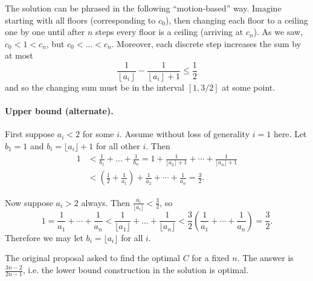 \begin{remark*}
  The solution can be phrased in the following ``motion-based'' way.
  Imagine starting with all floors (corresponding to $c_0$),
  then changing each floor to a ceiling one by one
  until after $n$ steps every floor is a ceiling (arriving at $c_n$).
  As we saw, $c_0 < 1 < c_n$, but $c_0 < \dots < c_n$.
  Moreover, each discrete step increases the sum by at most
  \[ \frac{1}{\left\lfloor a_i \right\rfloor}
    - \frac{1}{\left\lfloor a_i \right\rfloor + 1} \leq \frac 12 \]
  and so the changing sum must be in the interval $[1, 3/2]$ at some point.
\end{remark*}

\paragraph{Upper bound (alternate).}
First suppose $a_i < 2$ for some $i$. Assume without loss of generality $i=1$
here. Let $b_1=1$ and $b_i=\lfloor a_i\rfloor+1$ for all other $i$. Then
\begin{align*}
  1 &< \frac{1}{b_1} + \dots + \frac{1}{b_n} = 1 + \frac{1}{\lfloor a_2\rfloor +
  1} + \dotsb + \frac{1}{\lfloor a_n\rfloor + 1} \\
  &< \left(\frac{1}{2} +
  \frac{1}{a_1}\right) + \frac{1}{a_2} + \dotsb + \frac{1}{a_n} = \frac{3}{2}.
\end{align*}

Now suppose $a_i > 2$ always. Then $\frac{a_i}{\lfloor a_i\rfloor} <
\frac{3}{2}$, so
\[
  1 = \frac{1}{a_1} + \dotsb + \frac{1}{a_n} < \frac{1}{\lfloor a_1\rfloor} +
  \dots + \frac{1}{\lfloor a_n\rfloor} < \frac{3}{2}\left(\frac{1}{a_1} + \dotsb
  + \frac{1}{a_n}\right) = \frac{3}{2}.
\]
Therefore we may let $b_i=\lfloor a_i\rfloor$ for all $i$.

\begin{remark*}
  The original proposal asked to find the optimal $C$ for a fixed $n$. The
  answer is $\frac{3n-2}{2n-1}$, i.e. the lower bound construction in the
  solution is optimal.
\end{remark*}
